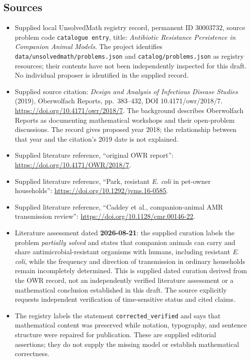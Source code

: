 \documentclass[11pt]{article}
\begin{document}
\subsection{Sources}
\begin{itemize}
\item Supplied local UnsolvedMath registry record, permanent ID \(30003732\), source problem code \texttt{catalogue entry}, title: \emph{Antibiotic Resistance Persistence in Companion Animal Models}. The project identifies \texttt{data/unsolvedmath/problems.json} and \texttt{catalog/problems.json} as registry resources; their contents have not been independently inspected for this draft. No individual proposer is identified in the supplied record.
\item Supplied source citation: \emph{Design and Analysis of Infectious Disease Studies} (2019), Oberwolfach Reports, pp.\ 383--432, DOI 10.4171/owr/2018/7. \url{https://doi.org/10.4171/owr/2018/7}. The background describes Oberwolfach Reports as documenting mathematical workshops and their open-problem discussions. The record gives proposed year 2018; the relationship between that year and the citation's 2019 date is not explained.
\item Supplied literature reference, ``original OWR report'': \url{https://doi.org/10.4171/OWR/2018/7}.
\item Supplied literature reference, ``Park, resistant \textit{E. coli} in pet-owner households'': \url{https://doi.org/10.1292/jvms.16-0585}.
\item Supplied literature reference, ``Caddey et al., companion-animal AMR transmission review'': \url{https://doi.org/10.1128/cmr.00146-22}.
\item Literature assessment dated \textbf{2026-08-21}: the supplied curation labels the problem \emph{partially solved} and states that companion animals can carry and share antimicrobial-resistant organisms with humans, including resistant \textit{E. coli}, while the frequency and direction of transmission in ordinary households remain incompletely determined. This is supplied dated curation derived from the OWR record, not an independently verified literature assessment or a mathematical conclusion established in this draft. The source explicitly requests independent verification of time-sensitive status and cited claims.
\item The registry labels the statement \texttt{corrected\_verified} and says that mathematical content was preserved while notation, typography, and sentence structure were repaired for publication. These are supplied editorial assertions; they do not supply the missing model or establish mathematical correctness.
\end{itemize}
\end{document}
